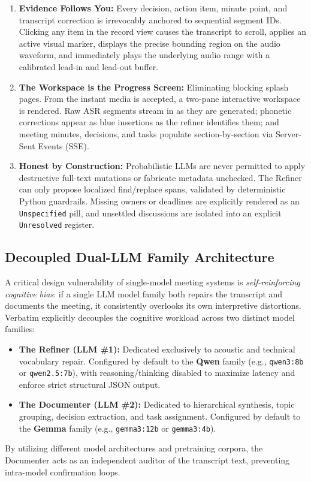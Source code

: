 \documentclass[10pt,a4paper]{article}
\begin{document}
\begin{calloutbox}[title=The Three Foundational Design Pillars of Verbatim]
\begin{enumerate}[label=\textbf{\arabic*.}]
    \item \textbf{Evidence Follows You:} Every decision, action item, minute point, and transcript correction is irrevocably anchored to sequential segment IDs. Clicking any item in the record view causes the transcript to scroll, applies an active visual marker, displays the precise bounding region on the audio waveform, and immediately plays the underlying audio range with a calibrated lead-in and lead-out buffer.
    \item \textbf{The Workspace is the Progress Screen:} Eliminating blocking splash pages. From the instant media is accepted, a two-pane interactive workspace is rendered. Raw ASR segments stream in as they are generated; phonetic corrections appear as blue insertions as the refiner identifies them; and meeting minutes, decisions, and tasks populate section-by-section via Server-Sent Events (SSE).
    \item \textbf{Honest by Construction:} Probabilistic LLMs are never permitted to apply destructive full-text mutations or fabricate metadata unchecked. The Refiner can only propose localized find/replace spans, validated by deterministic Python guardrails. Missing owners or deadlines are explicitly rendered as an \texttt{Unspecified} pill, and unsettled discussions are isolated into an explicit \texttt{Unresolved} register.
\end{enumerate}
\end{calloutbox}

\subsection{Decoupled Dual-LLM Family Architecture}
A critical design vulnerability of single-model meeting systems is \textit{self-reinforcing cognitive bias}: if a single LLM model family both repairs the transcript and documents the meeting, it consistently overlooks its own interpretive distortions. Verbatim explicitly decouples the cognitive workload across two distinct model families:
\begin{itemize}
    \item \textbf{The Refiner (LLM \#1):} Dedicated exclusively to acoustic and technical vocabulary repair. Configured by default to the \textbf{Qwen} family (e.g., \texttt{qwen3:8b} or \texttt{qwen2.5:7b}), with reasoning/thinking disabled to maximize latency and enforce strict structural JSON output.
    \item \textbf{The Documenter (LLM \#2):} Dedicated to hierarchical synthesis, topic grouping, decision extraction, and task assignment. Configured by default to the \textbf{Gemma} family (e.g., \texttt{gemma3:12b} or \texttt{gemma3:4b}).
\end{itemize}
By utilizing different model architectures and pretraining corpora, the Documenter acts as an independent auditor of the transcript text, preventing intra-model confirmation loops.
\end{document}
